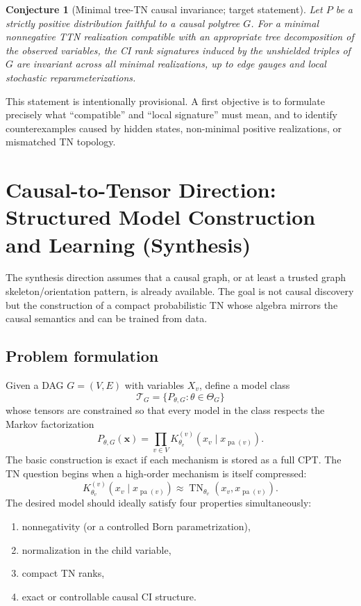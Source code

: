 \documentclass[11pt]{article}
\newtheorem{conjecture}[definition]{Conjecture}
\theoremstyle{remark}
\newcommand{\pa}{\operatorname{pa}}
\newcommand{\TN}{\operatorname{TN}}
\newcommand{\cT}{\mathcal T}
\begin{document}
\begin{conjecture}[Minimal tree-TN causal invariance; target statement]
Let $P$ be a strictly positive distribution faithful to a causal polytree $G$. For a minimal nonnegative TTN realization compatible with an appropriate tree decomposition of the observed variables, the CI rank signatures induced by the unshielded triples of $G$ are invariant across all minimal realizations, up to edge gauges and local stochastic reparameterizations.
\end{conjecture}

This statement is intentionally provisional. A first objective is to formulate precisely what ``compatible'' and ``local signature'' must mean, and to identify counterexamples caused by hidden states, non-minimal positive realizations, or mismatched TN topology.

\section{Causal-to-Tensor Direction: Structured Model Construction and Learning (Synthesis)}
\label{sec:synthesis}

The synthesis direction assumes that a causal graph, or at least a trusted graph skeleton/orientation pattern, is already available. The goal is not causal discovery but the construction of a compact probabilistic TN whose algebra mirrors the causal semantics and can be trained from data.

\subsection{Problem formulation}

Given a DAG $G=(V,E)$ with variables $X_v$, define a model class
\begin{equation}
\cT_G=\{P_{\theta,G}:\theta\in\Theta_G\}
\end{equation}
whose tensors are constrained so that every model in the class respects the Markov factorization
\begin{equation}
P_{\theta,G}(\bm x)=\prod_{v\in V}K^{(v)}_{\theta_v}(x_v\mid x_{\pa(v)}).
\label{eq:synthesis-bn}
\end{equation}
The basic construction is exact if each mechanism is stored as a full CPT. The TN question begins when a high-order mechanism is itself compressed:
\begin{equation}
K^{(v)}_{\theta_v}(x_v\mid x_{\pa(v)})
\approx \TN_{\theta_v}(x_v,x_{\pa(v)}).
\end{equation}
The desired model should ideally satisfy four properties simultaneously:
\begin{enumerate}
\item nonnegativity (or a controlled Born parametrization),
\item normalization in the child variable,
\item compact TN ranks,
\item exact or controllable causal CI structure.
\end{enumerate}
\end{document}
